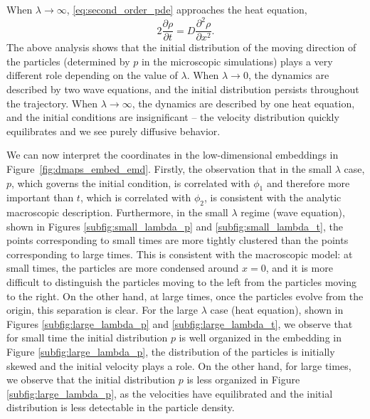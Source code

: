 \documentclass[prl, reprint, final, showkeys]{revtex4-1}
\begin{document}
When $\lambda \rightarrow \infty$, \eqref{eq:second_order_pde} approaches the heat equation,
\begin{equation}
2 \frac{\partial \rho}{\partial t} = D \frac{\partial ^2 \rho}{\partial x^2}.
\end{equation}
%
%
The above analysis shows that the initial distribution of the moving direction of the particles (determined by $p$ in the microscopic simulations) plays a very different role depending on the value of $\lambda$.
%
When $\lambda \rightarrow 0$, the dynamics are described by two wave equations, and the initial distribution persists throughout the trajectory.
%
When $\lambda \rightarrow \infty$, the dynamics are described by one heat equation, and the initial conditions are insignificant -- the velocity distribution quickly equilibrates and we see purely diffusive behavior.

We can now interpret the coordinates in the low-dimensional embeddings in Figure~\ref{fig:dmaps_embed_emd}.
%
Firstly, the observation that in the small $\lambda$ case, $p$, which governs the initial condition, is correlated with $\phi_1$ and therefore more important than $t$, which is correlated with $\phi_2$, is consistent with the analytic macroscopic description. 
%
Furthermore, in the small $\lambda$ regime (wave equation), shown in Figures \ref{subfig:small_lambda_p} and \ref{subfig:small_lambda_t}, the points corresponding to small times are more tightly clustered than the points corresponding to large times.
%
This is consistent with the macroscopic model: at small times, the particles are more condensed around $x=0$, and it is more difficult to distinguish the particles moving to the left from the particles moving to the right. 
%
On the other hand, at large times, once the particles evolve from the origin, this separation is clear.  
%
For the large $\lambda$ case (heat equation), shown in Figures \ref{subfig:large_lambda_p} and \ref{subfig:large_lambda_t}, we observe that for small time the initial distribution $p$ is well organized in the embedding in Figure \ref{subfig:large_lambda_p}, the distribution of the particles is initially skewed and the initial velocity plays a role. 
%
On the other hand, for large times, we observe that the initial distribution $p$ is less organized in Figure \ref{subfig:large_lambda_p}, as the velocities have equilibrated and the initial distribution is less detectable in the particle density.
\end{document}
